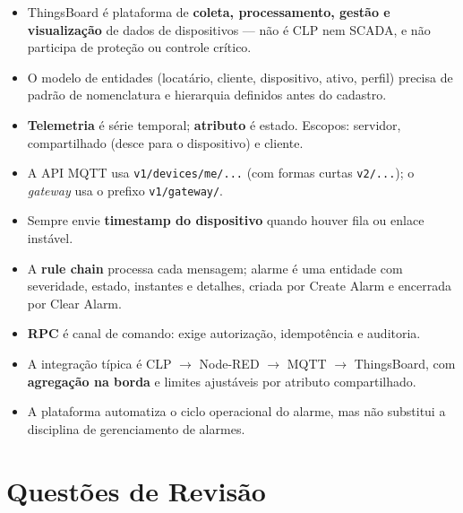 \begin{itemize}
\tightlist
\item
  ThingsBoard é plataforma de \textbf{coleta, processamento, gestão e visualização} de dados de dispositivos --- não é CLP nem SCADA, e não participa de proteção ou controle crítico.
\item
  O modelo de entidades (locatário, cliente, dispositivo, ativo, perfil) precisa de padrão de nomenclatura e hierarquia definidos antes do cadastro.
\item
  \textbf{Telemetria} é série temporal; \textbf{atributo} é estado. Escopos: servidor, compartilhado (desce para o dispositivo) e cliente.
\item
  A API MQTT usa \passthrough{\lstinline!v1/devices/me/...!} (com formas curtas \passthrough{\lstinline!v2/...!}); o \emph{gateway} usa o prefixo \passthrough{\lstinline!v1/gateway/!}.
\item
  Sempre envie \textbf{timestamp do dispositivo} quando houver fila ou enlace instável.
\item
  A \textbf{rule chain} processa cada mensagem; alarme é uma entidade com severidade, estado, instantes e detalhes, criada por Create Alarm e encerrada por Clear Alarm.
\item
  \textbf{RPC} é canal de comando: exige autorização, idempotência e auditoria.
\item
  A integração típica é CLP \ensuremath{\rightarrow} Node-RED \ensuremath{\rightarrow} MQTT \ensuremath{\rightarrow} ThingsBoard, com \textbf{agregação na borda} e limites ajustáveis por atributo compartilhado.
\item
  A plataforma automatiza o ciclo operacional do alarme, mas não substitui a disciplina de gerenciamento de alarmes.
\end{itemize}

\section{Questões de Revisão}\label{questuxf5es-de-revisuxe3o}

